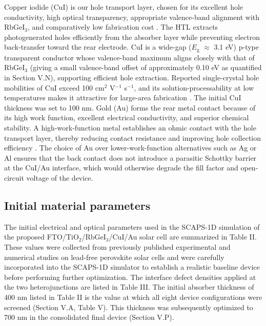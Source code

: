 \documentclass[review]{elsarticle}
\begin{document}
Copper iodide (CuI) is our hole transport layer, chosen for its excellent hole conductivity, high optical transparency, appropriate valence-band alignment with RbGeI$_{3}$, and comparatively low fabrication cost \cite{r25,r26,r33}. The HTL extracts photogenerated holes efficiently from the absorber layer while preventing electron back-transfer toward the rear electrode. CuI is a wide-gap ($E_{\mathrm{g}}$ $\approx$ 3.1 eV) p-type transparent conductor whose valence-band maximum aligns closely with that of RbGeI$_{3}$ (giving a small valence-band offset of approximately 0.10 eV as quantified in Section V.N), supporting efficient hole extraction. Reported single-crystal hole mobilities of CuI exceed 100 cm$^{2}$ V$^{-1}$ s$^{-1}$, and its solution-processability at low temperatures makes it attractive for large-area fabrication \cite{r27}. The initial CuI thickness was set to 100 nm.
Gold (Au) forms the rear metal contact because of its high work function, excellent electrical conductivity, and superior chemical stability. A high-work-function metal establishes an ohmic contact with the hole transport layer, thereby reducing contact resistance and improving hole collection efficiency \cite{r34}. The choice of Au over lower-work-function alternatives such as Ag or Al ensures that the back contact does not introduce a parasitic Schottky barrier at the CuI/\allowbreak{}Au interface, which would otherwise degrade the fill factor and open-circuit voltage of the device.

\subsection{Initial material parameters}
The initial electrical and optical parameters used in the SCAPS-1D simulation of the proposed FTO/\allowbreak{}TiO$_{2}$/RbGeI$_{3}$/CuI/\allowbreak{}Au solar cell are summarized in Table II. These values were collected from previously published experimental and numerical studies on lead-free perovskite solar cells \cite{r14,r15,r16,r19,r30} and were carefully incorporated into the SCAPS-1D simulator to establish a realistic baseline device before performing further optimization. The interface defect densities applied at the two heterojunctions are listed in Table III. The initial absorber thickness of 400 nm listed in Table II is the value at which all eight device configurations were screened (Section V.A, Table V). This thickness was subsequently optimized to 700 nm in the consolidated final device (Section V.P).
\end{document}
